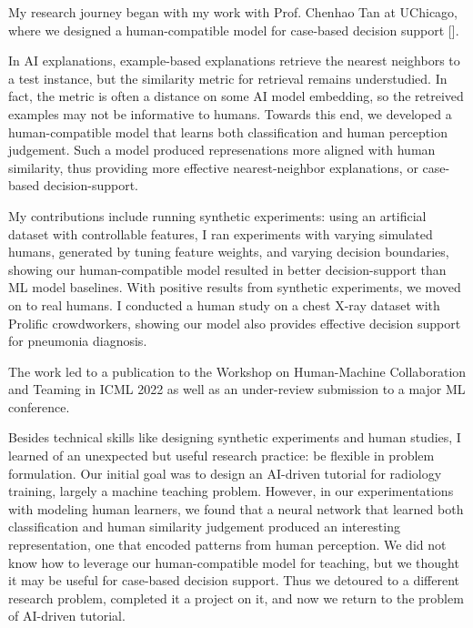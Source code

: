 


My research journey began with my work with Prof. Chenhao Tan at UChicago, where we designed a human-compatible model for case-based decision support []. 

In AI explanations, example-based explanations retrieve the nearest neighbors to a test instance, but the similarity metric for retrieval remains understudied. In fact, the metric is often a distance on some AI model embedding, so the retreived examples may not be informative to humans. 
Towards this end, we developed a human-compatible model that learns both classification and human perception judgement. Such a model produced represenations more aligned with human similarity, thus providing more effective nearest-neighbor explanations, or case-based decision-support. 

My contributions include running synthetic experiments: using an artificial dataset with controllable features, I ran experiments with varying simulated humans, generated by tuning feature weights, and varying decision boundaries, showing our human-compatible model resulted in better decision-support than ML model baselines. 
With positive results from synthetic experiments, we moved on to real humans. I conducted a human study on a chest X-ray dataset with Prolific crowdworkers, showing our model also provides effective decision support for pneumonia diagnosis. 

The work led to a publication to the Workshop on Human-Machine Collaboration and Teaming in ICML 2022 as well as an under-review submission to a major ML conference.

Besides technical skills like designing synthetic experiments and human studies, I learned of an unexpected but useful research practice: be flexible in problem formulation. 
Our initial goal was to design an AI-driven tutorial for radiology training, largely a machine teaching problem. However, in our experimentations with modeling human learners, we found that a neural network that learned both classification and human similarity judgement produced an interesting representation, one that encoded patterns from human perception. We did not know how to leverage our human-compatible model for teaching, but we thought it may be useful for case-based decision support. 
Thus we detoured to a different research problem, completed it a project on it, and now we return to the problem of AI-driven tutorial.



